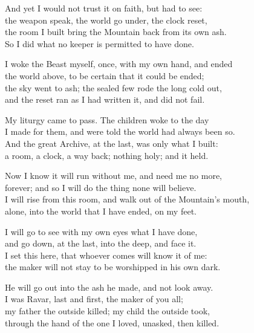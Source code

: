 \begin{founder}
\ornament

And yet I would not trust it on faith, but had to see:\\
the weapon speak, the world go under, the clock reset,\\
the room I built bring the Mountain back from its own ash.\\
So I did what no keeper is permitted to have done.\\
\medskip

I woke the Beast myself, once, with my own hand, and ended\\
the world above, to be certain that it could be ended;\\
the sky went to ash; the sealed few rode the long cold out,\\
and the reset ran as I had written it, and did not fail.\\
\medskip

My liturgy came to pass. The children woke to the day\\
I made for them, and were told the world had always been so.\\
And the great Archive, at the last, was only what I built:\\
a room, a clock, a way back; nothing holy; and it held.\\
\medskip

Now I know it will run without me, and need me no more,\\
forever; and so I will do the thing none will believe.\\
I will rise from this room, and walk out of the Mountain's mouth,\\
alone, into the world that I have ended, on my feet.\\
\medskip

I will go to see with my own eyes what I have done,\\
and go down, at the last, into the deep, and face it.\\
I set this here, that whoever comes will know it of me:\\
the maker will not stay to be worshipped in his own dark.\\
\medskip

He will go out into the ash he made, and not look away.\\
I was Ravar, last and first, the maker of you all;\\
my father the outside killed; my child the outside took,\\
through the hand of the one I loved, unasked, then killed.\\
\medskip


\end{founder}
